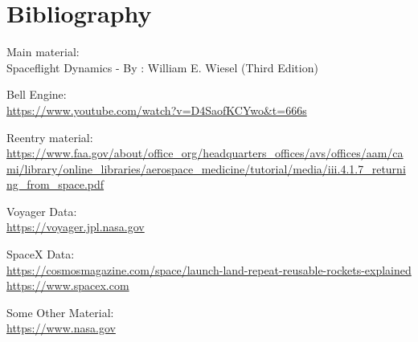 \documentclass[12pt, letterpaper]{article}
\begin{document}
\newpage

\section{Bibliography}

Main material:\\
Spaceflight Dynamics - By : William E. Wiesel (Third Edition)\\
\vspace{1px}

Bell Engine:\\
\url{https://www.youtube.com/watch?v=D4SaofKCYwo&t=666s}\\
\vspace{1px}

Reentry material:\\
\url{https://www.faa.gov/about/office_org/headquarters_offices/avs/offices/aam/cami/library/online_libraries/aerospace_medicine/tutorial/media/iii.4.1.7_returning_from_space.pdf}\\
\vspace{1px}

Voyager Data:\\
\url{https://voyager.jpl.nasa.gov}\\
\vspace{1px}

SpaceX Data:\\
\url{https://cosmosmagazine.com/space/launch-land-repeat-reusable-rockets-explained}
\url{https://www.spacex.com}\\
\vspace{1px}

Some Other Material:\\
\url{https://www.nasa.gov}
\end{document}
